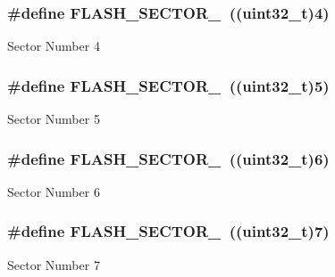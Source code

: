 \subsubsection[{\texorpdfstring{F\+L\+A\+S\+H\+\_\+\+S\+E\+C\+T\+O\+R\+\_\+4}{FLASH_SECTOR_4}}]{\setlength{\rightskip}{0pt plus 5cm}\#define F\+L\+A\+S\+H\+\_\+\+S\+E\+C\+T\+O\+R\+\_~((uint32\+\_\+t)4)}\hypertarget{group___f_l_a_s_h_ex___sectors_gac1338c8f4ab3ae74d212c59c7e9e4cc6}{}\label{group___f_l_a_s_h_ex___sectors_gac1338c8f4ab3ae74d212c59c7e9e4cc6}
Sector Number 4 
\subsubsection[{\texorpdfstring{F\+L\+A\+S\+H\+\_\+\+S\+E\+C\+T\+O\+R\+\_\+5}{FLASH_SECTOR_5}}]{\setlength{\rightskip}{0pt plus 5cm}\#define F\+L\+A\+S\+H\+\_\+\+S\+E\+C\+T\+O\+R\+\_~((uint32\+\_\+t)5)}\hypertarget{group___f_l_a_s_h_ex___sectors_gad8736215a8d3ce115f4281a6d026d0f8}{}\label{group___f_l_a_s_h_ex___sectors_gad8736215a8d3ce115f4281a6d026d0f8}
Sector Number 5 
\subsubsection[{\texorpdfstring{F\+L\+A\+S\+H\+\_\+\+S\+E\+C\+T\+O\+R\+\_\+6}{FLASH_SECTOR_6}}]{\setlength{\rightskip}{0pt plus 5cm}\#define F\+L\+A\+S\+H\+\_\+\+S\+E\+C\+T\+O\+R\+\_~((uint32\+\_\+t)6)}\hypertarget{group___f_l_a_s_h_ex___sectors_gaa0d1fc04e5918186ac9c228ab4172606}{}\label{group___f_l_a_s_h_ex___sectors_gaa0d1fc04e5918186ac9c228ab4172606}
Sector Number 6 
\subsubsection[{\texorpdfstring{F\+L\+A\+S\+H\+\_\+\+S\+E\+C\+T\+O\+R\+\_\+7}{FLASH_SECTOR_7}}]{\setlength{\rightskip}{0pt plus 5cm}\#define F\+L\+A\+S\+H\+\_\+\+S\+E\+C\+T\+O\+R\+\_~((uint32\+\_\+t)7)}\hypertarget{group___f_l_a_s_h_ex___sectors_ga99693b9e0816fdb8706218bc845724ad}{}\label{group___f_l_a_s_h_ex___sectors_ga99693b9e0816fdb8706218bc845724ad}
Sector Number 7 